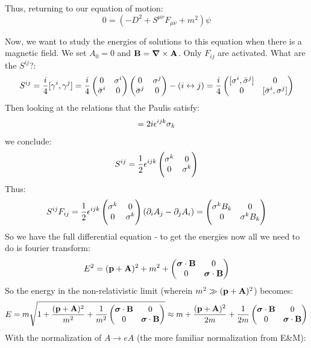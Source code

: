 Thus, returning to our equation of motion:
\begin{equation}
    0 = (-D^2 + S^{\mu\nu}F_{\mu\nu} + m^2)\psi
\end{equation}

Now, we want to study the energies of solutions to this equation when there is a magnetic field. We set $A_0 = 0$ and $\v{B} = \nabla \times \v{A}$. Only $F_{ij}$ are activated. What are the $S^{ij}$?:
\begin{equation}
    S^{ij} = \frac{i}{4}[\gamma^i, \gamma^j] = \frac{i}{4}\begin{pmatrix}0 & \sigma^i \\ \bar{\sigma}^i & 0\end{pmatrix}\begin{pmatrix}0 & \sigma^j \\ \bar{\sigma}^j & 0\end{pmatrix} - (i\leftrightarrow j) = \frac{i}{4}\begin{pmatrix}[\sigma^i, \bar{\sigma}^j] & 0 \\ 0 & [\bar{\sigma}^i, \sigma^j]\end{pmatrix}
\end{equation}
Then looking at the relations that the Paulis satisfy:
\begin{equation}
    [\sigma^i, \sigma^j] = 2i\e^{ijk}\sigma_k
\end{equation}
we conclude:
\begin{equation}
    S^{ij} = \frac{1}{2}\epsilon^{ijk}\begin{pmatrix}\sigma^k & 0 \\ 0 & \sigma^k\end{pmatrix}
\end{equation}
Thus:
\begin{equation}
    S^{ij}F_{ij} = \frac{1}{2}\epsilon^{ijk}\begin{pmatrix}\sigma^k & 0 \\ 0 & \sigma^k\end{pmatrix} (\partial_i A_j - \partial_j A_i) = \begin{pmatrix}\sigma^kB_k & 0 \\ 0 & \sigma^k B_k\end{pmatrix}
\end{equation}
So we have the full differential equation - to get the energies now all we need to do is fourier transform:
\begin{equation}
    E^2 = (\mathbf{p} + \mathbf{A})^2 + m^2 + \begin{pmatrix}\mbox{\boldmath$ \sigma $} \cdot \mathbf{B} & 0 \\ 0 & \mbox{\boldmath$ \sigma $} \cdot \mathbf{B}\end{pmatrix}
\end{equation}
So the energy in the non-relativistic limit (wherein $m^2 \gg (\mathbf{p} + \mathbf{A})^2$) becomes:
\begin{equation}
    E = m\sqrt{1 + \frac{(\mathbf{p} + \mathbf{A})^2}{m^2} + \frac{1}{m^2} \begin{pmatrix}\mbox{\boldmath$ \sigma $} \cdot \mathbf{B} & 0 \\ 0 & \mbox{\boldmath$ \sigma $} \cdot \mathbf{B}\end{pmatrix}} \approx m + \frac{(\mathbf{p} + \mathbf{A})^2}{2m} + \frac{1}{2m}\begin{pmatrix}\mbox{\boldmath$ \sigma $} \cdot \mathbf{B} & 0 \\ 0 & \mbox{\boldmath$ \sigma $} \cdot \mathbf{B}\end{pmatrix}
\end{equation}
With the normalization of $A \to eA$ (the more familiar normalization from E\&M):
